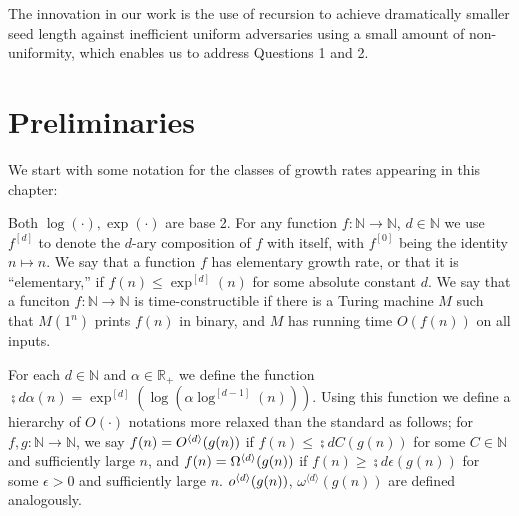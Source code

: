 The innovation in our work is the use of recursion to achieve dramatically smaller seed length against inefficient uniform adversaries using a small amount of non-uniformity, which enables us to address Questions 1 and 2.

\section{Preliminaries}
We start with some notation for the classes of growth rates appearing in this chapter:


\begin{definition}
Both $\log(\cdot), \exp(\cdot)$ are base 2. For any function $f: \mathbb{N} \to \mathbb{N}$, $d \in \mathbb{N}$ we use $f^{[d]}$ to denote the $d$-ary composition of $f$ with itself, with $f^{[0]}$ being the identity $n \mapsto n$. We say that a function $f$ has elementary growth rate, or that it is ``elementary,'' if $f(n) \leq \exp^{[d]}(n)$ for some absolute constant $d$. We say that a funciton $f: \mathbb{N} \to \mathbb{N}$ is time-constructible if there is a Turing machine $M$ such that $M(1^n)$ prints $f(n)$ in binary, and $M$ has running time $O(f(n))$ on all inputs.

For each $d \in \mathbb{N}$ and $\alpha \in \mathbb{R}_{+}$ we define the function $\semi{d}{\alpha}(n) = \exp^{[d]}(\log(\alpha \log^{[d-1]}(n)))$.
Using this function we define a hierarchy of $O(\cdot)$ notations more relaxed than the standard as follows; for $f,g:\mathbb{N} \to \mathbb{N}$, we say $f(n) = O^{\langle d \rangle}(g(n))$ if $f(n) \leq \semi{d}{C}(g(n))$ for some $C \in \mathbb{N}$ and sufficiently large $n$, and $f(n) = \Omega^{\langle d \rangle}(g(n))$ if $f(n) \geq \semi{d}{\epsilon}(g(n))$ for some $\epsilon > 0$ and sufficiently large $n$. $o^{\langle d \rangle}(g(n))$, $\omega^{\langle d \rangle}(g(n))$ are defined analogously. 
\end{definition}

